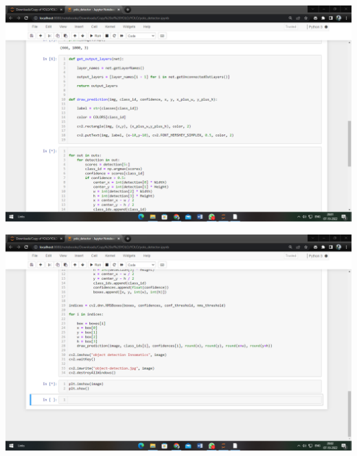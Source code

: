 \documentclass[
	11pt, %
	aspectratio=169, %
]{beamer}
\begin{document}
\begin{frame}
\begin{center}
\begin{minipage}{0.30\textwidth}
	\includegraphics[width=\textwidth]{Screenshot (5).png}
\end{minipage}\hfill
\centering
	\begin{minipage}{0.30\textwidth}
	\includegraphics[width=\textwidth]{Screenshot (6).png}
\end{minipage}
\end{center}
\end{frame}
\end{document}
